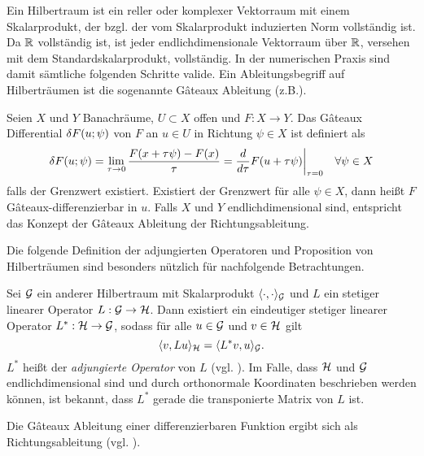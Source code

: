 Ein Hilbertraum ist ein reller oder komplexer Vektorraum mit einem Skalarprodukt, der bzgl. der vom Skalarprodukt induzierten Norm vollständig ist. Da $\mathbb{R}$ vollständig ist, ist jeder endlichdimensionale Vektorraum über $\mathbb{R}$, versehen mit dem Standardskalarprodukt, vollständig. In der numerischen Praxis sind damit sämtliche folgenden Schritte valide. 
Ein Ableitungsbegriff auf Hilberträumen ist die sogenannte Gâteaux Ableitung (z.B.\cite[]{lindenstrauss2003frechet}).
\begin{definition}
 Seien $X$ und $Y$ Banachräume, $U \subset X$ offen und $F:X\to Y$. Das Gâteaux Differential $\delta F(u;\psi)$ von $F$ an $u\in U$ in Richtung $\psi\in X$ ist definiert als
 \[
  \delta F(u;\psi) = \lim_{\tau \to 0} \frac{F(x+\tau \psi) - F(x)}{\tau} = \frac{d}{d\tau} F(u+\tau\psi)\biggr\rvert_{\tau = 0}\quad \forall \psi \in X
 \]
 falls der Grenzwert existiert. Existiert der Grenzwert für alle $\psi\in X$, dann heißt $F$ Gâteaux-differenzierbar in $u$.
 Falls $X$ und $Y$ endlichdimensional sind, entspricht das Konzept der Gâteaux Ableitung der Richtungsableitung.
\end{definition}
Die folgende Definition der adjungierten Operatoren und Proposition von Hilberträumen sind besonders nützlich für nachfolgende Betrachtungen.
\begin{definition}\label{def:adjointOperators}
Sei $\mathcal{G}$ ein anderer Hilbertraum mit Skalarprodukt $\langle \cdot,\cdot \rangle_{\mathcal{G}}$ und $L$ ein stetiger linearer Operator $L:\mathcal{G}\to \mathcal{H}$. Dann existiert ein eindeutiger stetiger linearer Operator $L^*:\mathcal{H}\to\mathcal{G}$, sodass für alle $u\in \mathcal{G}$ und $v\in \mathcal{H}$ gilt
\begin{equation}
\label{eq:adjointInnerProduct}
\langle v,Lu\rangle_{\mathcal{H}} =  \langle L^*v,u \rangle_{\mathcal{G}}.
\end{equation}
$L^*$ heißt der \textit{adjungierte Operator} von $L$ (vgl. \cite[Definition V.5.1]{werner2007funktionalanalysis}). Im Falle, dass $\mathcal{H}$ und $\mathcal{G}$ endlichdimensional sind und durch orthonormale Koordinaten beschrieben werden können, ist bekannt, dass  $L^*$ gerade die transponierte Matrix von $L$ ist.
\end{definition}
Die Gâteaux Ableitung einer differenzierbaren Funktion ergibt sich als Richtungsableitung (vgl. \cite[Example 9.2.4]{debnath2005hilbert}).
